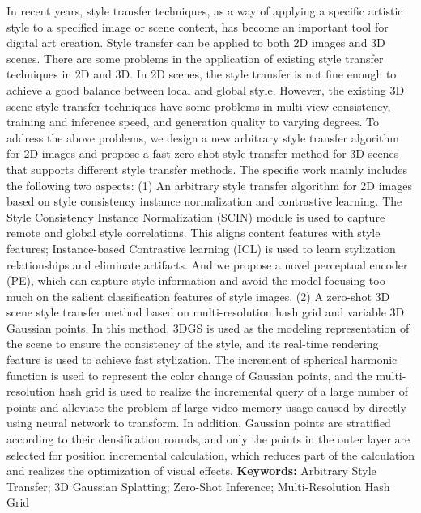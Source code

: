 \cleardoublepage
{}
In recent years, style transfer techniques, as a way of applying a specific artistic style to a specified image or scene content, has become an important tool for digital art creation. 
Style transfer can be applied to both 2D images and 3D scenes. There are some problems in the application of existing style transfer techniques in 2D and 3D. 
In 2D scenes, the style transfer is not fine enough to achieve a good balance between local and global style. 
However, the existing 3D scene style transfer techniques have some problems in multi-view consistency, training and inference speed, and generation quality to varying degrees. 
To address the above problems, we design a new arbitrary style transfer algorithm for 2D images and propose a fast zero-shot style transfer method for 3D scenes that supports different style transfer methods. The specific work mainly includes the following two aspects:
\newline \indent(1) An arbitrary style transfer algorithm for 2D images based on style consistency instance normalization and contrastive learning. 
The Style Consistency Instance Normalization (SCIN) module is used to capture remote and global style correlations. 
This aligns content features with style features; 
Instance-based Contrastive learning (ICL) is used to learn stylization relationships and eliminate artifacts. 
And we propose a novel perceptual encoder (PE), 
which can capture style information and avoid the model focusing too much on the salient classification features of style images.
\newline \indent(2) A zero-shot 3D scene style transfer method based on multi-resolution hash grid and variable 3D Gaussian points. 
In this method, 3DGS is used as the modeling representation of the scene to ensure the consistency of the style, 
and its real-time rendering feature is used to achieve fast stylization. 
The increment of spherical harmonic function is used to represent the color change of Gaussian points, 
and the multi-resolution hash grid is used to realize the incremental query of a large number of points and alleviate the problem of large video memory usage caused by directly using neural network to transform.
In addition, Gaussian points are stratified according to their densification rounds, 
and only the points in the outer layer are selected for position incremental calculation, 
which reduces part of the calculation and realizes the optimization of visual effects.
\newline
{\textbf{Keywords:}} 
Arbitrary Style Transfer; 3D Gaussian Splatting; Zero-Shot Inference; Multi-Resolution Hash Grid
